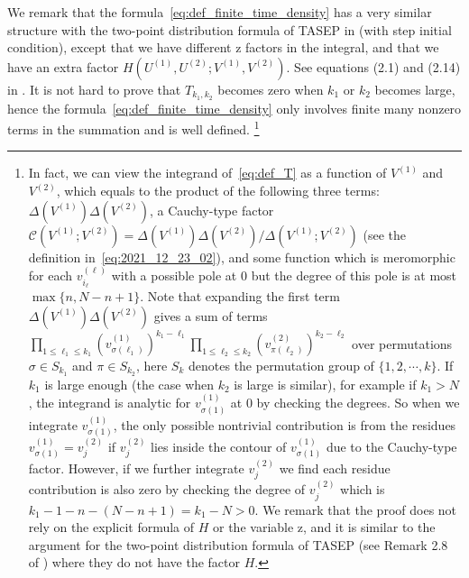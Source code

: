 \documentclass{article}
\numberwithin{equation}{section}
\newcommand{\Ch}{\mathcal{C}}
\newcommand{\rz}{\mathrm{z}}
\begin{document}
We remark that the formula~\eqref{eq:def_finite_time_density} has a very similar structure with the two-point distribution formula of TASEP in \cite{Liu19} (with step initial condition), except that we have different $\rz$ factors in the integral, and that we have an extra factor $H(U^{(1)},U^{(2)};V^{(1)},V^{(2)})$. See equations (2.1) and (2.14) in \cite{Liu19}. It is not hard to prove that $T_{k_1,k_2}$ becomes zero when $k_1$ or $k_2$ becomes large, hence the formula~\eqref{eq:def_finite_time_density}  only involves finite many nonzero terms in the summation and is well defined. \footnote{In fact, we can view the integrand of~\eqref{eq:def_T} as a function of $V^{(1)}$ and $V^{(2)}$, which equals to the product of the following three terms: $\Delta(V^{(1)})\Delta(V^{(2)})$, a Cauchy-type factor $\Ch(V^{(1)};V^{(2)})=\Delta(V^{(1)})\Delta(V^{(2)}) /\Delta(V^{(1)};V^{(2)})$ (see the definition in~\eqref{eq:2021_12_23_02}), and some function which is meromorphic for each $v_{i_\ell}^{(\ell)}$ with a possible pole at $0$ but the degree of this pole is at most $\max\{n,N-n+1\}$. Note that expanding the first term $\Delta(V^{(1)})\Delta(V^{(2)})$ gives a sum of terms $\prod_{1\le \ell_1\le k_1}(v_{\sigma(\ell_1)}^{(1)})^{k_1-\ell_1}\prod_{1\le \ell_2\le k_2}(v_{\pi(\ell_2)}^{(2)})^{k_2-\ell_2}$ over permutations $\sigma\in S_{k_1}$ and $\pi\in S_{k_2}$, here $S_k$ denotes the permutation group of $\{1,2,\cdots,k\}$. If $k_1$ is large enough (the case when $k_2$ is large is similar), for example if $k_1>N$, the integrand is analytic for $v_{\sigma(1)}^{(1)}$ at $0$ by checking the degrees. So when we integrate $v_{\sigma(1)}^{(1)}$, the only possible nontrivial contribution is from the residues $v_{\sigma(1)}^{(1)}=v_{j}^{(2)}$ if $v_j^{(2)}$ lies inside the contour of $v_{\sigma(1)}^{(1)}$ due to the Cauchy-type factor. However, if we further integrate $v_{j}^{(2)}$ we find each residue contribution is also zero by checking the degree of $v_j^{(2)}$ which is $k_1-1-n-(N-n+1)=k_1-N>0$. We remark that the proof does not rely on the explicit formula of $H$ or the variable $\rz$, and it is similar to the argument for the two-point distribution formula of TASEP (see Remark 2.8 of \cite{Liu19}) where they do not have the factor $H$.}
\end{document}
